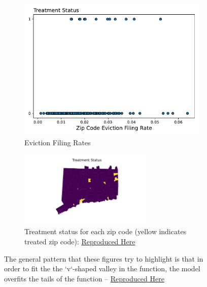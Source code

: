 \documentclass[a4paper,12pt]{article}
\begin{document}
\begin{figure}[htbp]
\centering
\begin{subfigure}{.48\textwidth}
    \centering
    \includegraphics[width=.95\linewidth]{figures/rtc/context/eviction_filing_rate_per_pop.pdf}
    \caption{Eviction Filing Rates}
    \label{fig:efr}
\end{subfigure}
\begin{subfigure}{.48\textwidth}
    \centering
\includegraphics[width=0.7\textwidth]{figures/rtc/maps/zip_code_status.pdf}  
        \caption{Treatment status for each zip code (yellow indicates treated zip code): \href{https://github.com/pharringtonp19/evictions/blob/main/scripts/joint/maps/treatment_status.py}{Reproduced Here}}
    \label{fig:treated_areas}
\end{subfigure}
\caption{The general pattern that these figures try to highlight is that in order to fit the the `v`-shaped valley in the function, the model overfits the tails of the function -- \href{https://github.com/pharringtonp19/jmp_paper/blob/main/notebooks/gradient_descent_motivating_example.ipynb}{Reproduced Here}}
\end{figure}
\end{document}
